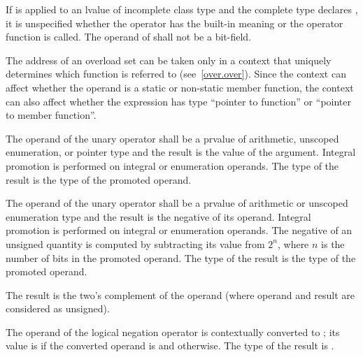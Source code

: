 \pnum
If \tcode{\&} is applied to an lvalue of incomplete class type and the
complete type declares , it is unspecified whether
the operator has the built-in meaning or the operator function is
called. The operand of \tcode{\&} shall not be a bit-field.

\pnum
{}%
\begin{note}
The address of an overload set can be taken
only in a context that uniquely determines
which function is referred to (see~\ref{over.over}).
Since the context can affect whether the operand is a static or
non-static member function, the context can also affect whether the
expression has type ``pointer to function'' or ``pointer to member
function''.
\end{note}

\pnum
{}%
The operand of the unary \tcode{+} operator shall be a prvalue of
arithmetic, unscoped
enumeration, or pointer type and the result is the value of the
argument. Integral promotion is performed on integral or enumeration
operands. The type of the result is the type of the promoted operand.

\pnum
{}%
The operand of the unary \tcode{-} operator shall be a prvalue of
arithmetic or unscoped
enumeration type and the result is the negative of its operand. Integral
promotion is performed on integral or enumeration operands. The negative
of an unsigned quantity is computed by subtracting its value from $2^n$,
where $n$ is the number of bits in the promoted operand. The type of the
result is the type of the promoted operand.
\begin{note}
The result is the two's complement of the operand
(where operand and result are considered as unsigned).
\end{note}

\pnum
{}%
The operand of the logical negation operator \tcode{!} is contextually
converted to ;
its value is 
if the converted operand is  and  otherwise.
The type of the result is .

